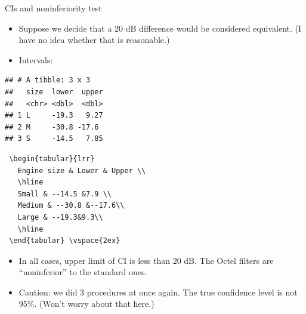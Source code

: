 \documentclass[ignorenonframetext,]{beamer}
\newenvironment{Shaded}{\begin{snugshade}}{\end{snugshade}}
\newcommand{\DataTypeTok}[1]{\textcolor[rgb]{0.13,0.29,0.53}{#1}}
\newcommand{\DecValTok}[1]{\textcolor[rgb]{0.00,0.00,0.81}{#1}}
\newcommand{\KeywordTok}[1]{\textcolor[rgb]{0.13,0.29,0.53}{\textbf{#1}}}
\newcommand{\NormalTok}[1]{#1}
\newcommand{\OperatorTok}[1]{\textcolor[rgb]{0.81,0.36,0.00}{\textbf{#1}}}
\newcommand{\StringTok}[1]{\textcolor[rgb]{0.31,0.60,0.02}{#1}}
\begin{document}
\begin{frame}[fragile]{CIs and noninferiority test}
\protect\hypertarget{cis-and-noninferiority-test}{}

\begin{itemize}
\item
  Suppose we decide that a 20 dB difference would be considered
  equivalent. (I have no idea whether that is reasonable.)
\item
  Intervals: \vspace{2ex}
\end{itemize}

\begin{Shaded}
\end{Shaded}

\begin{verbatim}
## # A tibble: 3 x 3
##   size  lower  upper
##   <chr> <dbl>  <dbl>
## 1 L     -19.3   9.27
## 2 M     -30.8 -17.6 
## 3 S     -14.5   7.85
\end{verbatim}

\begin{verbatim}
 \begin{tabular}{lrr}
   Engine size & Lower & Upper \\
   \hline
   Small & --14.5 &7.9 \\
   Medium & --30.8 &--17.6\\
   Large & --19.3&9.3\\
   \hline
 \end{tabular} \vspace{2ex}
\end{verbatim}

\begin{itemize}
\item
  In all cases, upper limit of CI is less than 20 dB. The Octel filters
  are ``noninferior'' to the standard ones.
\item
  Caution: we did 3 procedures at once again. The true confidence level
  is not 95\%. (Won't worry about that here.)
\end{itemize}

\end{frame}
\end{document}
